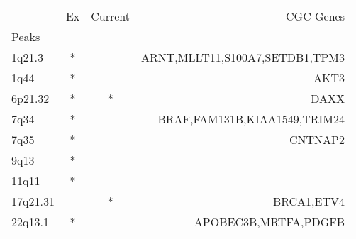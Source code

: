 \begin{tabular}{lccr}
\toprule
{} & Ex & Current &                       CGC Genes \\
Peaks    &    &         &                                 \\
\midrule
1q21.3   &  * &         &  ARNT,MLLT11,S100A7,SETDB1,TPM3 \\
1q44     &  * &         &                            AKT3 \\
6p21.32  &  * &       * &                            DAXX \\
7q34     &  * &         &    BRAF,FAM131B,KIAA1549,TRIM24 \\
7q35     &  * &         &                         CNTNAP2 \\
9q13     &  * &         &                                 \\
11q11    &  * &         &                                 \\
17q21.31 &    &       * &                      BRCA1,ETV4 \\
22q13.1  &  * &         &            APOBEC3B,MRTFA,PDGFB \\
\bottomrule
\end{tabular}

